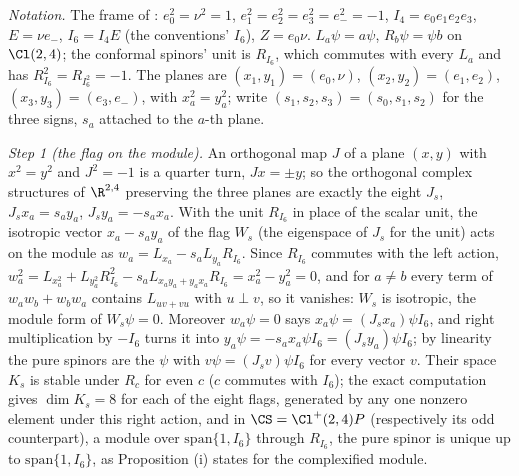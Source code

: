 \emph{Notation.} The frame of : $e_{0}^{2} = \nu^{2} = 1$, $e_{1}^{2} = e_{2}^{2} = e_{3}^{2} = e_{-}^{2} = -1$, $I_{4} = e_{0}e_{1}e_{2}e_{3}$, $E = \nu e_{-}$, $I_{6} = I_{4}E$ (the conventions' $I_{6}$), $Z = e_{0}\nu$. $L_{a}\psi = a\psi$, $R_{b}\psi = \psi b$ on $\Cl(2,4)$; the conformal spinors' unit is $R_{I_{6}}$, which commutes with every $L_{a}$ and has $R_{I_{6}}^{2} = R_{I_{6}^{2}} = -1$. The planes are $(x_{1}, y_{1}) = (e_{0}, \nu)$, $(x_{2}, y_{2}) = (e_{1}, e_{2})$, $(x_{3}, y_{3}) = (e_{3}, e_{-})$, with $x_{a}^{2} = y_{a}^{2}$; write $(s_{1}, s_{2}, s_{3}) = (s_{0}, s_{1}, s_{2})$ for the three signs, $s_{a}$ attached to the $a$-th plane.

\emph{Step 1 (the flag on the module).} An orthogonal map $J$ of a plane $(x, y)$ with $x^{2} = y^{2}$ and $J^{2} = -1$ is a quarter turn, $Jx = \pm y$; so the orthogonal complex structures of $\R^{2,4}$ preserving the three planes are exactly the eight $J_{s}$, $J_{s}x_{a} = s_{a}y_{a}$, $J_{s}y_{a} = -s_{a}x_{a}$. With the unit $R_{I_{6}}$ in place of the scalar unit, the isotropic vector $x_{a} - s_{a}y_{a}$ of the flag $W_{s}$ (the eigenspace of $J_{s}$ for the unit) acts on the module as $w_{a} = L_{x_{a}} - s_{a}L_{y_{a}}R_{I_{6}}$. Since $R_{I_{6}}$ commutes with the left action, $w_{a}^{2} = L_{x_{a}^{2}} + L_{y_{a}^{2}}R_{I_{6}}^{2} - s_{a}L_{x_{a}y_{a} + y_{a}x_{a}}R_{I_{6}} = x_{a}^{2} - y_{a}^{2} = 0$, and for $a \ne b$ every term of $w_{a}w_{b} + w_{b}w_{a}$ contains $L_{u v + v u}$ with $u \perp v$, so it vanishes: $W_{s}$ is isotropic, the module form of $W_{s}\psi = 0$. Moreover $w_{a}\psi = 0$ says $x_{a}\psi = (J_{s}x_{a})\psi I_{6}$, and right multiplication by $-I_{6}$ turns it into $y_{a}\psi = -s_{a}x_{a}\psi I_{6} = (J_{s}y_{a})\psi I_{6}$; by linearity the pure spinors are the $\psi$ with $v\psi = (J_{s}v)\psi I_{6}$ for every vector $v$. Their space $K_{s}$ is stable under $R_{c}$ for even $c$ ($c$ commutes with $I_{6}$); the exact computation gives $\dim K_{s} = 8$ for each of the eight flags, generated by any one nonzero element under this right action, and in $\CS = \Cl^{+}(2,4)P$ (respectively its odd counterpart), a module over $\mathrm{span}\{1, I_{6}\}$ through $R_{I_{6}}$, the pure spinor is unique up to $\mathrm{span}\{1, I_{6}\}$, as Proposition (i) states for the complexified module.

